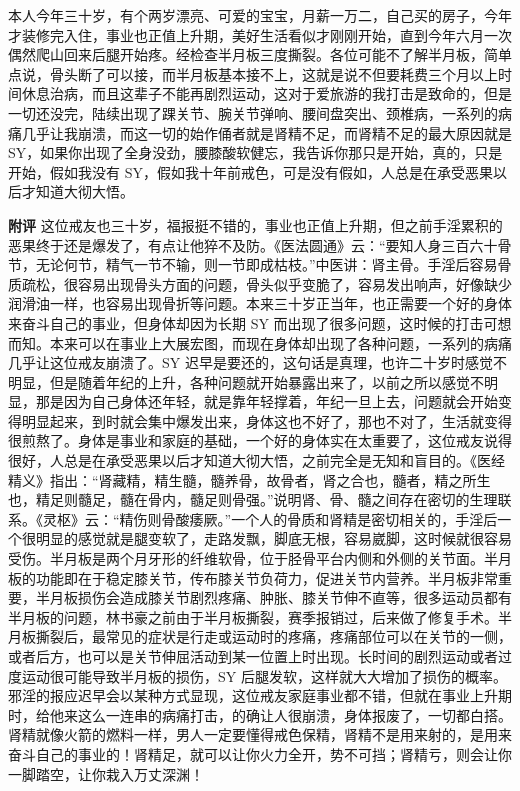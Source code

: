 \begin{case}
    本人今年三十岁，有个两岁漂亮、可爱的宝宝，月薪一万二，自己买的房子，今年才装修完入住，事业也正值上升期，美好生活看似才刚刚开始，直到今年六月一次偶然爬山回来后腿开始疼。经检查半月板三度撕裂。各位可能不了解半月板，简单点说，骨头断了可以接，而半月板基本接不上，这就是说不但要耗费三个月以上时间休息治病，而且这辈子不能再剧烈运动，这对于爱旅游的我打击是致命的，但是一切还没完，陆续出现了踝关节、腕关节弹响、腰间盘突出、颈椎病，一系列的病痛几乎让我崩溃，而这一切的始作俑者就是肾精不足，而肾精不足的最大原因就是 SY，如果你出现了全身没劲，腰膝酸软健忘，我告诉你那只是开始，真的，只是开始，假如我没有 SY，假如我十年前戒色，可是没有假如，人总是在承受恶果以后才知道大彻大悟。

    \textbf{附评} 这位戒友也三十岁，福报挺不错的，事业也正值上升期，但之前手淫累积的恶果终于还是爆发了，有点让他猝不及防。《医法圆通》云：“要知人身三百六十骨节，无论何节，精气一节不输，则一节即成枯枝。”中医讲：肾主骨。手淫后容易骨质疏松，很容易出现骨头方面的问题，骨头似乎变脆了，容易发出响声，好像缺少润滑油一样，也容易出现骨折等问题。本来三十岁正当年，也正需要一个好的身体来奋斗自己的事业，但身体却因为长期 SY 而出现了很多问题，这时候的打击可想而知。本来可以在事业上大展宏图，而现在身体却出现了各种问题，一系列的病痛几乎让这位戒友崩溃了。SY 迟早是要还的，这句话是真理，也许二十岁时感觉不明显，但是随着年纪的上升，各种问题就开始暴露出来了，以前之所以感觉不明显，那是因为自己身体还年轻，就是靠年轻撑着，年纪一旦上去，问题就会开始变得明显起来，到时就会集中爆发出来，身体这也不好了，那也不对了，生活就变得很煎熬了。身体是事业和家庭的基础，一个好的身体实在太重要了，这位戒友说得很好，人总是在承受恶果以后才知道大彻大悟，之前完全是无知和盲目的。《医经精义》指出：“肾藏精，精生髓，髓养骨，故骨者，肾之合也，髓者，精之所生也，精足则髓足，髓在骨内，髓足则骨强。”说明肾、骨、髓之间存在密切的生理联系。《灵枢》云：“精伤则骨酸痿厥。”一个人的骨质和肾精是密切相关的，手淫后一个很明显的感觉就是腿变软了，走路发飘，脚底无根，容易崴脚，这时候就很容易受伤。半月板是两个月牙形的纤维软骨，位于胫骨平台内侧和外侧的关节面。半月板的功能即在于稳定膝关节，传布膝关节负荷力，促进关节内营养。半月板非常重要，半月板损伤会造成膝关节剧烈疼痛、肿胀、膝关节伸不直等，很多运动员都有半月板的问题，林书豪之前由于半月板撕裂，赛季报销过，后来做了修复手术。半月板撕裂后，最常见的症状是行走或运动时的疼痛，疼痛部位可以在关节的一侧，或者后方，也可以是关节伸屈活动到某一位置上时出现。长时间的剧烈运动或者过度运动很可能导致半月板的损伤，SY 后腿发软，这样就大大增加了损伤的概率。邪淫的报应迟早会以某种方式显现，这位戒友家庭事业都不错，但就在事业上升期时，给他来这么一连串的病痛打击，的确让人很崩溃，身体报废了，一切都白搭。肾精就像火箭的燃料一样，男人一定要懂得戒色保精，肾精不是用来射的，是用来奋斗自己的事业的！肾精足，就可以让你火力全开，势不可挡；肾精亏，则会让你一脚踏空，让你栽入万丈深渊！
\end{case}

